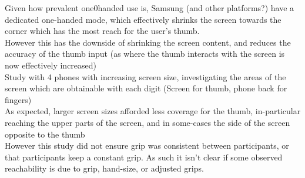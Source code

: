 Given how prevalent one0handed use is, Samsung \citep{samsung2021onehand} (and other platforms?) have a dedicated one-handed mode, which effectively shrinks the screen towards the corner which has the most reach for the user's thumb.\\
However this has the downside of shrinking the screen content, and reduces the accuracy of the thumb input (as where the thumb interacts with the screen is now effectively increased)\\

Study with 4 phones with increasing screen size, investigating the areas of the screen which are obtainable with each digit (Screen for thumb, phone back for fingers)\\
As expected, larger screen sizes afforded less coverage for the thumb, in-particular reaching the upper parts of the screen, and in some-cases the side of the screen opposite to the thumb\\
However this study did not ensure grip was consistent between participants, or that participants keep a constant grip. As such it isn't clear if some observed reachability is due to grip, hand-size, or adjusted grips.\\



